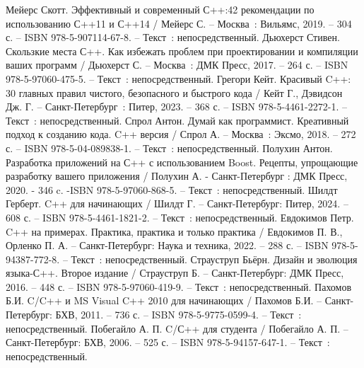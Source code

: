 \begin{thebibliography}{23}
     Мейерс Скотт. Эффективный и современный С++:42 рекомендации по использованию С++11 и С++14 / Мейерс С. – Москва~: Вильямс, 2019. – 304 с. – ISBN 978-5-907114-67-8. – Текст~: непосредственный.
	 Дьюхерст Стивен. Скользкие места С++. Как избежать проблем при проектировании и компиляции ваших программ / Дьюхерст С. – Москва~: ДМК Пресс, 2017. – 264 с. – ISBN 978-5-97060-475-5. – Текст~: непосредственный.
	 Грегори Кейт. Красивый C++: 30 главных правил чистого, безопасного и быстрого кода / Кейт Г., Дэвидсон Дж. Г. – Санкт-Петербург~: Питер, 2023. – 368 с. – ISBN 978-5-4461-2272-1. – Текст~: непосредственный.
	 Спрол Антон. Думай как программист. Креативный подход к созданию кода. C++ версия / Спрол А. – Москва~: Эксмо, 2018. – 272 с. – ISBN 978-5-04-089838-1. – Текст~: непосредственный.
	 Полухин Антон. Разработка приложений на С++ с использованием Boost. Рецепты, упрощающие разработку вашего приложения / Полухин А. - Санкт-Петербург : ДМК Пресс, 2020. - 346 c. -ISBN 978-5-97060-868-5. – Текст~: непосредственный.
	 Шилдт Герберт. C++ для начинающих / Шилдт Г. – Санкт-Петербург: Питер, 2024. – 608 с. – ISBN 978-5-4461-1821-2. – Текст~: непосредственный.
	 Евдокимов Петр. C++ на примерах. Практика, практика и только практика / Евдокимов П. В., Орленко П. А. – Санкт-Петербург: Наука и техника, 2022. – 288 с. – ISBN 978-5-94387-772-8. – Текст~: непосредственный.
	 Страуструп Бьёрн. Дизайн и эволюция языка-С++. Второе издание / Страуструп Б. – Санкт-Петербург: ДМК Пресс, 2016. – 448 с. – ISBN 978-5-97060-419-9. – Текст~: непосредственный.
	 Пахомов Б.И. C/C++ и MS Visual C++ 2010 для начинающих / Пахомов Б.И. – Санкт-Петербург: БХВ, 2011. – 736 с. – ISBN 978-5-9775-0599-4. – Текст~: непосредственный.
	 Побегайло А. П.  C/С++ для студента / Побегайло А. П. – Санкт-Петербург: БХВ, 2006. – 525 с. – ISBN 978-5-94157-647-1. – Текст~: непосредственный.
\end{thebibliography}
